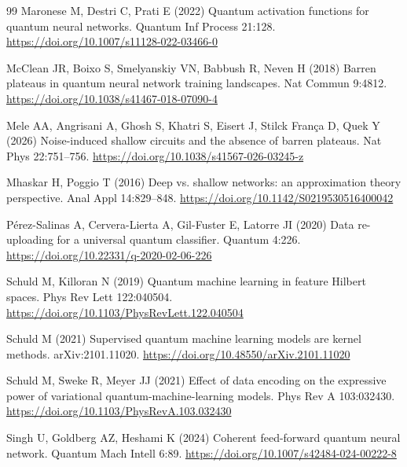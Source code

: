 \documentclass[pdflatex,sn-mathphys,NameDate,iicol]{sn-jnl}
\begin{document}
\begin{thebibliography}{99}
Maronese M, Destri C, Prati E (2022) Quantum activation functions for
quantum neural networks. Quantum Inf Process 21:128.
\url{https://doi.org/10.1007/s11128-022-03466-0}

McClean JR, Boixo S, Smelyanskiy VN, Babbush R, Neven H (2018) Barren
plateaus in quantum neural network training landscapes. Nat Commun 9:4812.
\url{https://doi.org/10.1038/s41467-018-07090-4}

Mele AA, Angrisani A, Ghosh S, Khatri S, Eisert J, Stilck Fran{\c c}a D,
Quek Y (2026) Noise-induced shallow circuits and the absence of barren
plateaus. Nat Phys 22:751--756.
\url{https://doi.org/10.1038/s41567-026-03245-z}

Mhaskar H, Poggio T (2016) Deep vs. shallow networks: an approximation
theory perspective. Anal Appl 14:829--848.
\url{https://doi.org/10.1142/S0219530516400042}

P{\'e}rez-Salinas A, Cervera-Lierta A, Gil-Fuster E, Latorre JI (2020)
Data re-uploading for a universal quantum classifier. Quantum 4:226.
\url{https://doi.org/10.22331/q-2020-02-06-226}

Schuld M, Killoran N (2019) Quantum machine learning in feature Hilbert
spaces. Phys Rev Lett 122:040504.
\url{https://doi.org/10.1103/PhysRevLett.122.040504}

Schuld M (2021) Supervised quantum machine learning models are kernel
methods. arXiv:2101.11020. \url{https://doi.org/10.48550/arXiv.2101.11020}

Schuld M, Sweke R, Meyer JJ (2021) Effect of data encoding on the expressive
power of variational quantum-machine-learning models. Phys Rev A 103:032430.
\url{https://doi.org/10.1103/PhysRevA.103.032430}

Singh U, Goldberg AZ, Heshami K (2024) Coherent feed-forward quantum neural
network. Quantum Mach Intell 6:89.
\url{https://doi.org/10.1007/s42484-024-00222-8}


\end{thebibliography}
\end{document}
